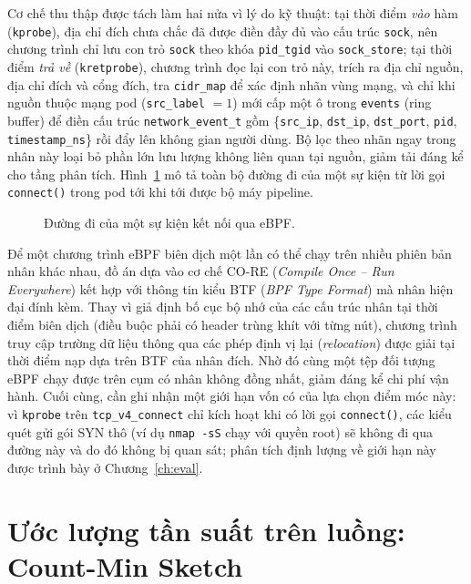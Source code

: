 Cơ chế thu thập được tách làm hai nửa vì lý do kỹ thuật: tại thời điểm \emph{vào}
hàm (\texttt{kprobe}), địa chỉ đích chưa chắc đã được điền đầy đủ vào cấu trúc
\texttt{sock}, nên chương trình chỉ lưu con trỏ \texttt{sock} theo khóa
\texttt{pid\_tgid} vào \texttt{sock\_store}; tại thời điểm \emph{trả về}
(\texttt{kretprobe}), chương trình đọc lại con trỏ này, trích ra địa chỉ nguồn,
địa chỉ đích và cổng đích, tra \texttt{cidr\_map} để xác định nhãn vùng mạng, và
chỉ khi nguồn thuộc mạng pod (\texttt{src\_label} $= 1$) mới cấp một ô trong
\texttt{events} (ring buffer) để điền cấu trúc \texttt{network\_event\_t} gồm
\{\texttt{src\_ip}, \texttt{dst\_ip}, \texttt{dst\_port}, \texttt{pid},
\texttt{timestamp\_ns}\} rồi đẩy lên không gian người dùng. Bộ lọc theo nhãn ngay
trong nhân này loại bỏ phần lớn lưu lượng không liên quan tại nguồn, giảm tải đáng
kể cho tầng phân tích. Hình~\ref{fig:packet-path} mô tả toàn bộ đường đi của một
sự kiện từ lời gọi \texttt{connect()} trong pod tới khi tới được bộ máy pipeline.

\begin{figure}[H]
  \centering
  \resizebox{0.6\linewidth}{!}{}
  \caption{Đường đi của một sự kiện kết nối qua eBPF.}
  \label{fig:packet-path}
\end{figure}

Để một chương trình eBPF biên dịch một lần có thể chạy trên nhiều phiên bản nhân
khác nhau, đồ án dựa vào cơ chế CO-RE (\textit{Compile Once -- Run Everywhere})
kết hợp với thông tin kiểu BTF (\textit{BPF Type Format}) mà nhân hiện đại đính
kèm. Thay vì giả định bố cục bộ nhớ của các cấu trúc nhân tại thời điểm biên dịch
(điều buộc phải có header trùng khít với từng nút), chương trình truy cập trường
dữ liệu thông qua các phép định vị lại (\textit{relocation}) được giải tại thời
điểm nạp dựa trên BTF của nhân đích. Nhờ đó cùng một tệp đối tượng eBPF chạy được
trên cụm có nhân không đồng nhất, giảm đáng kể chi phí vận hành. Cuối cùng, cần
ghi nhận một giới hạn vốn có của lựa chọn điểm móc này: vì \texttt{kprobe} trên
\texttt{tcp\_v4\_connect} chỉ kích hoạt khi có lời gọi \texttt{connect()}, các
kiểu quét gửi gói SYN thô (ví dụ \texttt{nmap -sS} chạy với quyền root) sẽ không
đi qua đường này và do đó không bị quan sát; phân tích định lượng về giới hạn này
được trình bày ở Chương~\ref{ch:eval}.

\section{Ước lượng tần suất trên luồng: Count-Min Sketch}
\label{sec:theory-cms}


